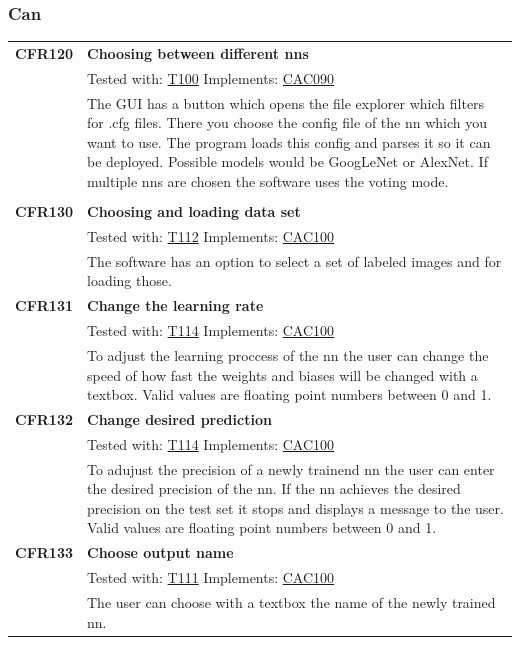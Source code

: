 \documentclass[parskip=full]{scrartcl}
\begin{document}
\subsubsection{Can}
\begin{tabular}{p{2cm}p{11.4cm}}
\textbf{CFR120} \hypertarget{CFR100} & \textbf{Choosing between different \glspl{nn}}\\
& Tested with: \hyperlink{T100}{T100} Implements: \hyperlink{CAC090}{CAC090} \\
& The GUI has a button which opens the file explorer which filters for .cfg files. There you choose the config file of the \gls{nn} which you want to use. The program loads this config and parses it so it can be deployed. Possible models would be GoogLeNet or AlexNet. If multiple \glspl{nn} are chosen the software uses the voting mode.\\
& \\
\textbf {CFR130} \hypertarget{CFR112} & \textbf{Choosing and loading data set} \\
& Tested with: \hyperlink{T112}{T112} Implements: \hyperlink{CAC100}{CAC100}\\
& The software has an option to select a set of labeled images and for loading those.\\
\textbf {CFR131} \hypertarget{CFR114} & \textbf{Change the learning rate} \\
& Tested with: \hyperlink{T114}{T114} Implements: \hyperlink{CAC100}{CAC100} \\
& To adjust the learning proccess of the \gls{nn} the user can change the speed of how fast the weights and biases will be changed with a textbox.  Valid values are floating point numbers between 0 and 1.\\
\textbf{CFR132} \hypertarget{CFR115} & \textbf{Change desired prediction}\\
& Tested with: \hyperlink{T114}{T114} Implements: \hyperlink{CAC100}{CAC100}\\
& To adujust the precision of a newly trainend \gls{nn} the user can enter the desired precision of the \gls{nn}. If the \gls{nn} achieves the desired precision on the test set it stops and displays a message to the user. Valid values are floating point numbers between 0 and 1.\\
\textbf{CFR133} \hypertarget{CFR116} & \textbf{Choose output name}\\
& Tested with: \hyperlink{T111}{T111} Implements: \hyperlink{CAC100}{CAC100}\\
& The user can choose with a textbox the name of the newly trained \gls{nn}.\\

\end{tabular}
\end{document}
